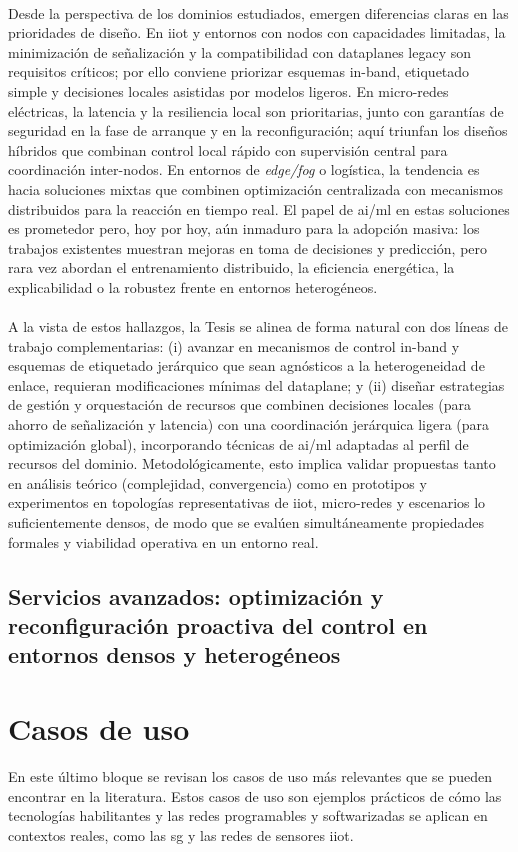 \\
Desde la perspectiva de los dominios estudiados, emergen diferencias claras en las prioridades de diseño. En \gls{iiot} y entornos con nodos con capacidades limitadas, la minimización de señalización y la compatibilidad con dataplanes legacy son requisitos críticos; por ello conviene priorizar esquemas in-band, etiquetado simple y decisiones locales asistidas por modelos ligeros. En micro-redes eléctricas, la latencia y la resiliencia local son prioritarias, junto con garantías de seguridad en la fase de arranque y en la reconfiguración; aquí triunfan los diseños híbridos que combinan control local rápido con supervisión central para coordinación inter-nodos. En entornos de \textit{edge/fog} o logística, la tendencia es hacia soluciones mixtas que combinen optimización centralizada con mecanismos distribuidos para la reacción en tiempo real. El papel de \gls{ai}/\gls{ml} en estas soluciones es prometedor pero, hoy por hoy, aún inmaduro para la adopción masiva: los trabajos existentes muestran mejoras en toma de decisiones y predicción, pero rara vez abordan el entrenamiento distribuido, la eficiencia energética, la explicabilidad o la robustez frente en entornos heterogéneos.\\
\\
A la vista de estos hallazgos, la Tesis se alinea de forma natural con dos líneas de trabajo complementarias: (i) avanzar en mecanismos de control in-band y esquemas de etiquetado jerárquico que sean agnósticos a la heterogeneidad de enlace, requieran modificaciones mínimas del dataplane; y (ii) diseñar estrategias de gestión y orquestación de recursos que combinen decisiones locales (para ahorro de señalización y latencia) con una coordinación jerárquica ligera (para optimización global), incorporando técnicas de \gls{ai}/\gls{ml} adaptadas al perfil de recursos del dominio. Metodológicamente, esto implica validar propuestas tanto en análisis teórico (complejidad, convergencia) como en prototipos y experimentos en topologías representativas de \gls{iiot}, micro-redes y escenarios lo suficientemente densos, de modo que se evalúen simultáneamente propiedades formales y viabilidad operativa en un entorno real.












\subsection{Servicios avanzados: optimización y reconfiguración proactiva del control en entornos densos y heterogéneos}



\section{Casos de uso}  
\label{sec:casos_de_uso}
En este último bloque se revisan los casos de uso más relevantes que se pueden encontrar en la literatura. Estos casos de uso son ejemplos prácticos de cómo las tecnologías habilitantes y las redes programables y softwarizadas se aplican en contextos reales, como las \gls{sg} y las redes de sensores \gls{iiot}. 